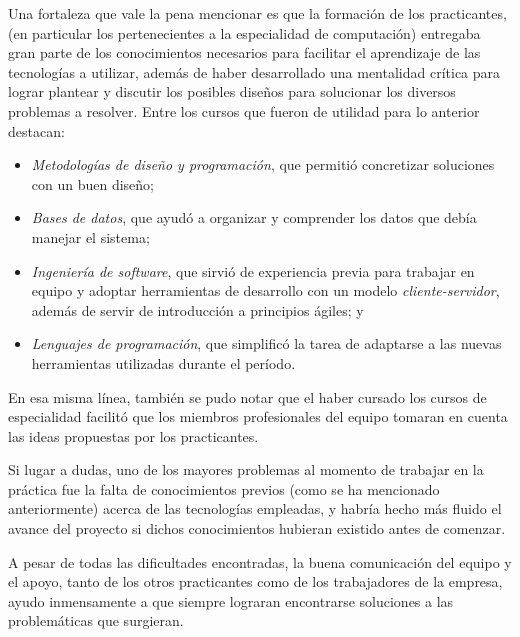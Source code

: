   Una fortaleza que vale la pena mencionar es que la formación de los practicantes, (en 
  particular los pertenecientes a la especialidad de computación) entregaba gran parte de
  los conocimientos necesarios para facilitar el aprendizaje de las tecnologías a 
  utilizar, además de haber desarrollado una mentalidad crítica para lograr plantear y 
  discutir los posibles diseños para solucionar los diversos problemas a resolver.
  Entre los cursos que fueron de utilidad para lo anterior destacan: 
  \begin{itemize}
    
    \item \textit{Metodologías de diseño y programación}, que permitió concretizar 
      soluciones con un buen diseño;
    
    \item \textit{Bases de datos}, que ayudó a organizar y comprender los datos que debía
      manejar el sistema;
    \item \textit{Ingeniería de software}, que sirvió de experiencia previa para trabajar 
      en equipo y adoptar herramientas de desarrollo con un modelo 
      \textit{cliente-servidor}, además de servir de introducción a principios ágiles; y
    \item \textit{Lenguajes de programación}, que simplificó la tarea de adaptarse a las 
      nuevas herramientas utilizadas durante el período.
  \end{itemize} 
  En esa misma línea, también se pudo notar que el haber cursado los cursos de 
  especialidad facilitó que los miembros profesionales del equipo tomaran en cuenta las 
  ideas propuestas por los practicantes.
  
  Si lugar a dudas, uno de los mayores problemas al momento de trabajar en la práctica fue
  la falta de conocimientos previos (como se ha mencionado anteriormente) acerca de las 
  tecnologías empleadas, y habría hecho más fluido el avance del proyecto si dichos 
  conocimientos hubieran existido antes de comenzar.

  A pesar de todas las dificultades encontradas, la buena comunicación del equipo y el 
  apoyo, tanto de los otros practicantes como de los trabajadores de la empresa, ayudo 
  inmensamente a que siempre lograran encontrarse soluciones a las problemáticas que 
  surgieran.

  \vfill
